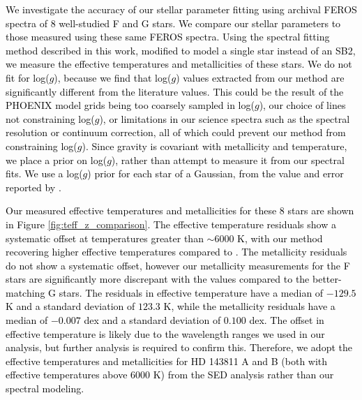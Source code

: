 \documentclass[]{aastex701} %
\begin{document}


\appendix 
\label{append}
\textcolor{black}{We investigate the accuracy of our stellar parameter fitting using archival FEROS spectra of 8 well-studied F and G stars. We compare our stellar parameters to those measured \citet{worley2012} using these same FEROS spectra. Using the spectral fitting method described in this work, modified to model a single star instead of an SB2, we measure the effective temperatures and metallicities of these stars. We do not fit for log($g$), because we find that log($g$) values extracted from our method are significantly different from the literature values. This could be the result of the PHOENIX model grids being too coarsely sampled in log($g$), our choice of lines not constraining log($g$), or limitations in our science spectra such as the spectral resolution or continuum correction, all of which could prevent our method from constraining log($g$). Since gravity is covariant with metallicity and temperature, we place a prior on log($g$), rather than attempt to measure it from our spectral fits. We use a log($g$) prior for each star of a Gaussian, from the value and error reported by \citet{worley2012}.}

\textcolor{black}{Our measured effective temperatures and metallicities for these 8 stars are shown in Figure \ref{fig:teff_z_comparison}. The effective temperature residuals show a systematic offset at temperatures greater than $\sim 6000$ K, with our method recovering higher effective temperatures compared to \citet{worley2012}. The metallicity residuals do not show a systematic offset, however our metallicity measurements for the F stars are significantly more discrepant with the \citet{worley2012} values compared to the better-matching G stars. The residuals in effective temperature have a median of $-129.5$ K and a standard deviation of $123.3$ K, while the metallicity residuals have a median of $-0.007$ dex and a standard deviation of $0.100$ dex. The offset in effective temperature is likely due to the wavelength ranges we used in our analysis, but further analysis is required to confirm this. Therefore, we adopt the effective temperatures and metallicities for HD 143811 A and B (both with effective temperatures above 6000 K) from the SED analysis rather than our spectral modeling. }
\end{document}
